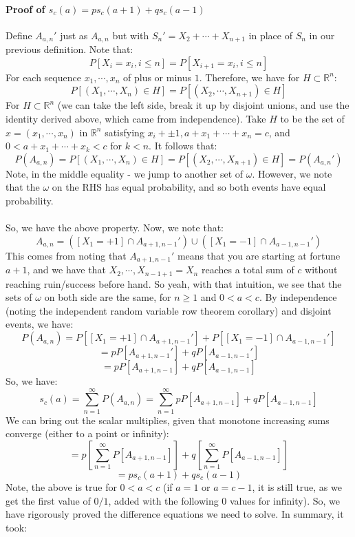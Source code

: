 \documentclass[12pt,a4paper]{article}
\newcommand{\1}[1]{\mathbbm{1}\left\{ #1 \right\}}
\newcommand{\R}{\mathbb{R}}
\begin{document}
\paragraph{Proof of $s_c(a) = ps_c(a + 1) + qs_c(a - 1)$}
Define $A_{a,n}'$ just as $A_{a,n}$ but with $S_n' = X_2 + \cdots + X_{n+1}$ in place of $S_n$ in our previous definition. Note that:
$$
	P[X_i = x_i, i \leq n] = P[X_{i+1} = x_i, i \leq n]
$$
For each sequence $x_1, \cdots, x_n$ of plus or minus $1$. Therefore, we have for $H \subset \R^n$:
$$
	P[(X_1, \cdots, X_n) \in H] = P[(X_2, \cdots, X_{n+1}) \in H]
$$
For $H \subset \R^n$ (we can take the left side, break it up by disjoint unions, and use the identity derived above, which came from independence). Take $H$ to be the set of $x = (x_1, \cdots, x_n)$ in $\R^n$ satisfying $x_i + \pm 1, a + x_1 + \cdots + x_n = c$, and $0 < a + x_1 + \cdots + x_k < c$ for $k < n$. It follows that:
$$
	P(A_{a,n}) = P[(X_1, \cdots, X_n) \in H] = P[(X_2, \cdots, X_{n+1}) \in H] = P(A_{a,n}')
$$
Note, in the middle equality - we jump to another set of $\omega$. However, we note that the $\omega$ on the RHS has equal probability, and so both events have equal probability.
\\\\
So, we have the above property. Now, we note that:
$$
	A_{a,n} = \left([X_1 = + 1] \cap A_{a+1, n-1}'\right) \cup \left([X_1 = - 1] \cap A_{a-1,n-1}'\right)
$$
This comes from noting that $A_{a+1, n-1}'$ means that you are starting at fortune $a + 1$, and we have that $X_2, \cdots, X_{n - 1 + 1} = X_n$ reaches a total sum of $c$ without reaching ruin/success before hand. So yeah, with that intuition, we see that the sets of $\omega$ on both side are the same, for $n \geq 1$ and $0 < a < c$. By independence (noting the independent random variable row theorem corollary) and disjoint events, we have:
$$
	P(A_{a,n}) = P\left[[X_1 = + 1] \cap A_{a+1, n-1}'\right] + P\left[[X_1 = - 1] \cap A_{a-1,n-1}'\right]
$$
$$
	= pP\left[A_{a+1, n-1}'\right] + qP\left[A_{a-1,n-1}'\right]
$$
$$
	= pP\left[A_{a+1, n-1}\right] + qP\left[A_{a-1,n-1}\right]
$$
So, we have:
$$
	s_c(a) = \sum_{n=1}^\infty P(A_{a,n}) =
	\sum_{n=1}^\infty pP\left[A_{a+1, n-1}\right] + qP\left[A_{a-1,n-1}\right]
$$
We can bring out the scalar multiplies, given that monotone increasing sums converge (either to a point or infinity):
$$
	= p\left[\sum_{n=1}^\infty P\left[A_{a+1, n-1}\right]\right] +
	q\left[\sum_{n=1}^\infty P\left[A_{a-1, n-1}\right]\right]
$$
$$
	= ps_c(a + 1) + qs_c(a - 1)
$$
Note, the above is true for $0 < a < c$ (if $a = 1$ or $a = c - 1$, it is still true, as we get the first value of $0/1$, added with the following $0$ values for infinity). So, we have rigorously proved the difference equations we need to solve. In summary, it took:
\end{document}
